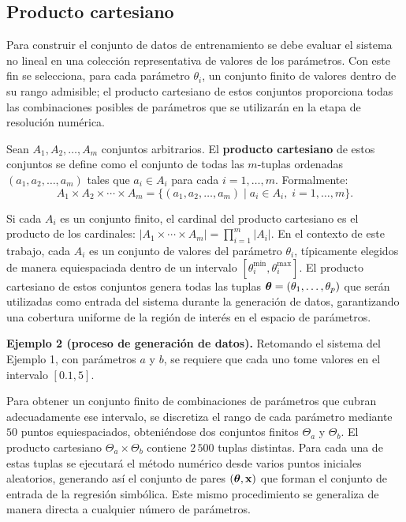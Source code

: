 \subsection{Producto cartesiano}

Para construir el conjunto de datos de entrenamiento se debe evaluar el sistema no lineal en una colección representativa de valores de los parámetros. Con este fin se selecciona, para cada parámetro
\(\theta_i\), un conjunto finito de valores dentro de su rango
admisible; el producto cartesiano de estos conjuntos proporciona todas las combinaciones posibles de parámetros que se utilizarán en la etapa de resolución numérica.

\begin{definition}
Sean \(A_1, A_2, \dots, A_m\) conjuntos arbitrarios. El \textbf{producto cartesiano} de estos conjuntos se define como el conjunto de todas las
\(m\)-tuplas ordenadas \((a_1, a_2, \dots, a_m)\) tales que
\(a_i \in A_i\) para cada \(i = 1, \dots, m\). Formalmente:
\begin{equation}
A_1 \times A_2 \times \cdots \times A_m = \{(a_1, a_2, \dots, a_m) \mid a_i \in A_i,\; i=1,\dots,m\}.
\end{equation}
\end{definition}

Si cada \(A_i\) es un conjunto finito, el cardinal del producto cartesiano es el producto de los cardinales:
\(|A_1 \times \cdots \times A_m| = \prod_{i=1}^m |A_i|\). En el contexto
de este trabajo, cada \(A_i\) es un conjunto de valores del parámetro
\(\theta_i\), típicamente elegidos de manera equiespaciada dentro de un
intervalo \([\theta_i^{\min}, \theta_i^{\max}]\). El producto cartesiano de estos conjuntos genera todas las tuplas
\(\boldsymbol{\theta} = (\theta_1, \dots, \theta_p)\) que serán utilizadas como
entrada del sistema durante la generación de datos, garantizando una cobertura uniforme de la región de interés en el espacio de parámetros.

\noindent\textbf{Ejemplo 2 (proceso de generación de datos).} Retomando el sistema del Ejemplo 1, con parámetros \(a\) y \(b\), se requiere que cada uno tome valores en el intervalo \([0.1, 5]\).

Para obtener un conjunto finito de combinaciones de parámetros que cubran adecuadamente ese intervalo, se discretiza el rango de cada parámetro mediante \(50\) puntos equiespaciados, obteniéndose dos conjuntos finitos \(\Theta_a\) y \(\Theta_b\). El producto cartesiano
\(\Theta_a \times \Theta_b\) contiene \(2\,500\) tuplas distintas. Para
cada una de estas tuplas se ejecutará el método numérico desde varios puntos iniciales aleatorios, generando así el conjunto de pares
\((\boldsymbol{\theta}, \mathbf{x})\) que forman el conjunto de entrada de la regresión
simbólica. Este mismo procedimiento se generaliza de manera directa a cualquier número de parámetros.

